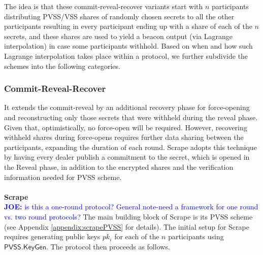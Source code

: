 \documentclass[letterpaper,twocolumn,10pt]{article}
\theoremstyle{definition}
\theoremstyle{remark}
\newcommand{\joenote}[1]{\textcolor{blue}{\textbf{JOE:} #1}}
\begin{document}
The idea is that these commit-reveal-recover variants start with $n$ participants distributing PVSS/VSS shares of randomly chosen secrets to all the other participants resulting in every participant ending up with a share of each of the $n$ secrets, and these shares are used to yield a beacon output (via Lagrange interpolation) in case some participants withhold. Based on when and how such Lagrange interpolation takes place within a protocol, we further subdivide the schemes into the following categories.

\subsubsection{Commit-Reveal-Recover}
It extends the commit-reveal by an additional recovery phase for force-opening and reconstructing only those secrets that were withheld during the reveal phase. Given that, optimistically, no force-open will be required. However, recovering withheld shares during force-opens requires further data sharing between the participants, expanding the duration of each round. Scrape \cite{cascudo2017scrape} adopts this technique by having every dealer publish a commitment to the secret, which is opened in the Reveal phase, in addition to the encrypted shares and the verification information needed for PVSS scheme.\\\\
\textbf{Scrape}\\
\joenote{is this a one-round protocol? General note-need a framework for one round vs. two round protocols?}
The main building block of Scrape is its PVSS scheme (see Appendix \ref{appendix:scrapePVSS} for details). The initial setup for Scrape requires generating public keys $pk_i$ for each of the $n$ participants using $\mathsf{PVSS.KeyGen}$. The protocol then proceeds as follows.
\end{document}
